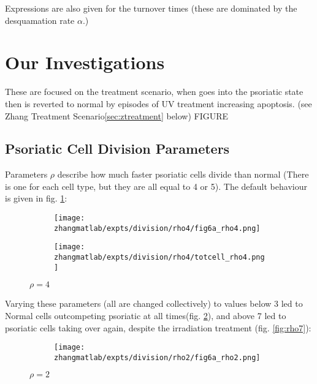 \documentclass[a4paper,10pt]{report}
\newcommand{\psortbase}{/home/ngrs2/work/bsu/PSORT_Zuliani_Reynolds/}
\newcommand{\zhangmatlab}{\psortbase/zhang_model}
\begin{document}
Expressions are also given for the turnover times (these are dominated by the desquamation rate $\alpha$.)


\section{Our Investigations}

These are focused on the treatment scenario, when goes into the psoriatic state then is reverted to normal by episodes of UV treatment increasing apoptosis. 
 (see Zhang Treatment Scenario\ref{sec:ztreatment} below)
FIGURE

\subsection{Psoriatic Cell Division Parameters}

Parameters $\rho$ describe how much faster psoriatic cells divide than normal
(There is one for each cell type, but they are all equal to 4 or 5). The default behaviour is given in fig. \ref{fig:rho4}:


\begin{figure}[h!]
  \begin{subfigure}{.5\textwidth}
    \centering
    \texttt{[image: \\zhangmatlab/expts/division/rho4/fig6a\_rho4.png]}
  \end{subfigure}
  \begin{subfigure}{.5\textwidth}
    \centering
    \texttt{[image: \\zhangmatlab/expts/division/rho4/totcell\_rho4.png]}
  \end{subfigure}
  \caption{$\rho=4$}
  \label{fig:rho4}
\end{figure}

Varying these parameters (all are changed collectively) to values below 3 led to Normal cells outcompeting psoriatic at all times(fig. \ref{fig:rho2}), and above 7 led to psoriatic cells taking over again, despite the irradiation treatment (fig. \ref{fig:rho7}):

\begin{figure}[h!]
  \begin{subfigure}{.5\textwidth}
    \centering
    \texttt{[image: \\zhangmatlab/expts/division/rho2/fig6a\_rho2.png]}
  \end{subfigure}
  \caption{$\rho=2$}
  \label{fig:rho2}
\end{figure}
\end{document}
